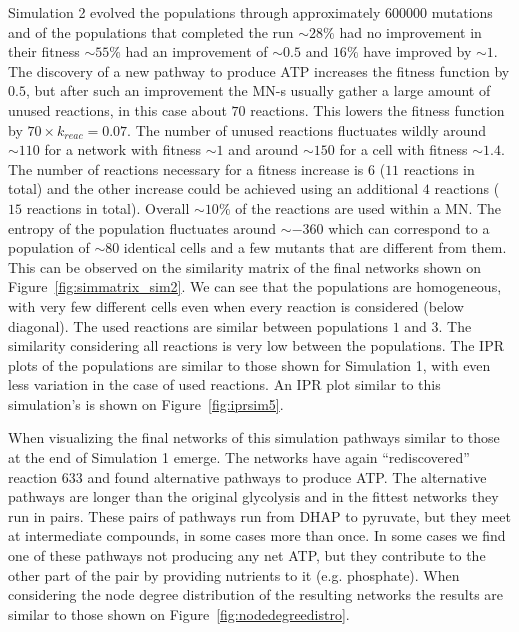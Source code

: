 \documentclass[a4paper,12pt]{article}
\begin{document}
Simulation 2 evolved the populations through approximately $600 000$ mutations and of the populations that completed the run $\sim 28 \%$ had no improvement in their fitness $\sim 55 \%$ had an improvement of $\sim 0.5$ and $16 \%$ have improved by $\sim 1$. The discovery of a new pathway to produce ATP increases the fitness function by $0.5$, but after such an improvement the MN-s usually gather a large amount of unused reactions, in this case about $70$ reactions. This lowers the fitness function by $70\times k_{reac}=0.07$. The number of unused reactions fluctuates wildly around $\sim 110$ for a network with fitness $\sim 1$ and around $\sim 150$ for a cell with fitness $\sim 1.4$. The number of reactions necessary for a fitness increase is $6$ ($11$ reactions in total) and the other increase could be achieved using an additional $4$ reactions ($15$ reactions in total). Overall $\sim 10\%$ of the reactions are used within a MN. The entropy of the population fluctuates around $\sim -360$ which can correspond to a population of $\sim 80$ identical cells and a few mutants that are different from them. This can be observed on the similarity matrix of the final networks shown on Figure~\ref{fig:simmatrix_sim2}. We can see that the populations are homogeneous, with very few different cells even when every reaction is considered (below diagonal). The used reactions are similar between populations $1$ and $3$. The similarity considering all reactions is very low between the populations. 
The IPR plots of the populations are similar to those shown for Simulation 1, with even less variation in the case of used reactions. An IPR plot similar to this simulation's is shown on Figure~\ref{fig:iprsim5}. 

When visualizing the final networks of this simulation pathways similar to those at the end of Simulation 1 emerge. The networks have again ``rediscovered'' reaction $633$ and found alternative pathways to produce ATP. The alternative pathways are longer than the original glycolysis and in the fittest networks they run in pairs. These pairs of pathways run from DHAP to pyruvate, but they meet at intermediate compounds, in some cases more than once. In some cases we find one of these pathways not producing any net ATP, but they contribute to the other part of the pair by providing nutrients to it (e.g. phosphate). When considering the node degree distribution of the resulting networks the results are similar to those shown on Figure~\ref{fig:nodedegreedistro}. 
\end{document}

